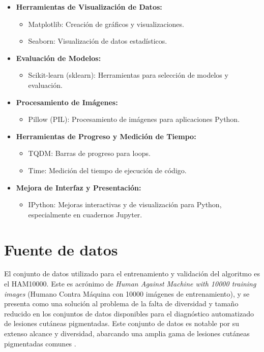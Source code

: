 \begin{itemize}
   \item \textbf{Herramientas de Visualización de Datos:}
   \begin{itemize}
       \item Matplotlib: Creación de gráficos y visualizaciones.
       \item Seaborn: Visualización de datos estadísticos.
   \end{itemize}

   \item \textbf{Evaluación de Modelos:}
   \begin{itemize}
       \item Scikit-learn (sklearn): Herramientas para selección de modelos y evaluación.
   \end{itemize}

   \item \textbf{Procesamiento de Imágenes:}
   \begin{itemize}
       \item Pillow (PIL): Procesamiento de imágenes para aplicaciones Python.
   \end{itemize}

   \item \textbf{Herramientas de Progreso y Medición de Tiempo:}
   \begin{itemize}
       \item TQDM: Barras de progreso para loops.
       \item Time: Medición del tiempo de ejecución de código.
   \end{itemize}

   \item \textbf{Mejora de Interfaz y Presentación:}
   \begin{itemize}
       \item IPython: Mejoras interactivas y de visualización para Python, especialmente en cuadernos Jupyter.
   \end{itemize}
\end{itemize}

\section{Fuente de datos}

El conjunto de datos utilizado para el entrenamiento y validación del algoritmo es el HAM10000. Este es acrónimo de \textit{Human Against Machine with 10000 training images} (Humano Contra Máquina con 10000 imágenes de entrenamiento), y se presenta como una solución al problema de la falta de diversidad y tamaño reducido en los conjuntos de datos disponibles para el diagnóstico automatizado de lesiones cutáneas pigmentadas. Este conjunto de datos es notable por su extenso alcance y diversidad, abarcando una amplia gama de lesiones cutáneas pigmentadas comunes . 

